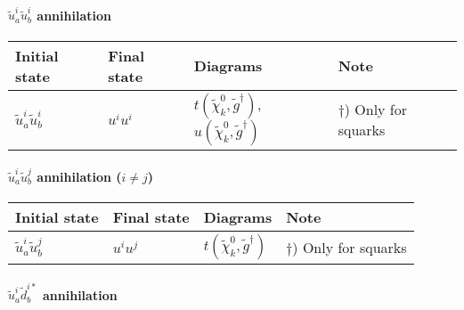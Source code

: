 \paragraph{$\tilde{u}^i_a \tilde{u}^{i}_b$ annihilation}

\begin{center}
\begin{tabular}{llll} \hline
{\bfseries Initial state} & {\bfseries Final state} &
{\bfseries Diagrams} & {\bfseries Note} \\ \hline \tabspace
$\tilde{u}^i_a\tilde{u}^{i}_b$ & $u^i u^i$ &
$t(\tilde{\chi}_{k}^0,\tilde{g}^\dagger)$, $u(\tilde{\chi}_{k}^0,\tilde{g}^\dagger)$ 
& $\dagger$) Only for squarks \\ \hline
\end{tabular}
\end{center}

\paragraph{$\tilde{u}^i_a \tilde{u}^{j}_b$ annihilation ($i \ne j$)}

\begin{center}
\begin{tabular}{llll} \hline
{\bfseries Initial state} & {\bfseries Final state} &
{\bfseries Diagrams} & {\bfseries Note} \\ \hline \tabspace
$\tilde{u}^i_a \tilde{u}^{j}_b$ & $u^i u^j$ &
$t(\tilde{\chi}_{k}^0,\tilde{g}^\dagger)$
& $\dagger$) Only for squarks \\ \hline
\end{tabular}
\end{center}

\paragraph{$\tilde{u}^i_a \tilde{d}_{b}^{i*}$ annihilation}

